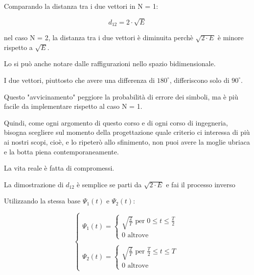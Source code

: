 \begin{tcolorbox}
    Comparando la distanza tra i due vettori in N = 1: 

    {
        \Large 
        \begin{equation}
            d_{12} = 2 \cdot \sqrt{E}
        \end{equation}
    }

    nel caso N = 2, 
    la distanza tra i due vettori è diminuita perchè $\sqrt{2 \cdot E}$ è minore rispetto a $\sqrt{E}$. \newline 

    Lo si può anche notare dalle raffigurazioni nello spazio bidimensionale. \newline 

    I due vettori, piuttosto che avere una differenza di $180^{\circ}$, 
    differiscono solo di $90^{\circ}$. \newline 

    Questo "avvicinamento" peggiore la probabilità di errore dei simboli, ma è più facile da implementare rispetto al caso N = 1. \newline 

    Quindi, come ogni argomento di questo corso e di ogni corso di ingegneria, bisogna scegliere sul momento della progettazione quale criterio ci interessa di più ai nostri scopi, 
    cioè, e lo ripeterò allo sfinimento, non puoi avere la moglie ubriaca e la botta piena contemporaneamente. \newline 
    
    La vita reale è fatta di compromessi. \newline 

    La dimostrazione di $d_{12}$ è semplice se parti da $\sqrt{2 \cdot E}$ e fai il processo inverso
\end{tcolorbox}

\newpage 

Utilizzando la stessa base $\Psi_1 (t)$ e $\Psi_2 (t)$: 

{
    \Large 
    \begin{equation}
        \begin{cases}
            \Psi_1 (t)
            = 
            \begin{cases}
                \sqrt{\frac{2}{T}} \text{ per } 0 \le t \le \frac{T}{2}
                \\
                0 \text{ altrove}
            \end{cases}
            \\
            \quad
            \\
            \Psi_2 (t)
             = 
            \begin{cases}
                \sqrt{\frac{2}{T}} \text{ per } \frac{T}{2} \le t \le T
                \\
                0 \text{ altrove}
            \end{cases}
        \end{cases}
    \end{equation}
}

